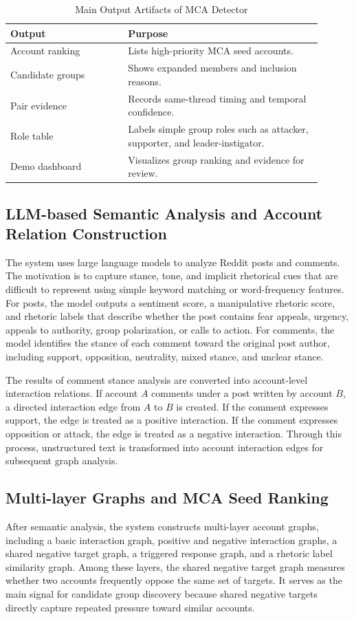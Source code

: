 \documentclass[conference]{IEEEtran}
\begin{document}
\begin{table}[htbp]
\caption{Main Output Artifacts of MCA Detector}
\label{tab:outputs}
\centering
\begin{tabular}{p{0.34\linewidth}p{0.56\linewidth}}
\toprule
\textbf{Output} & \textbf{Purpose} \\
\midrule
Account ranking & Lists high-priority MCA seed accounts. \\
Candidate groups & Shows expanded members and inclusion reasons. \\
Pair evidence & Records same-thread timing and temporal confidence. \\
Role table & Labels simple group roles such as attacker, supporter, and leader-instigator. \\
Demo dashboard & Visualizes group ranking and evidence for review. \\
\bottomrule
\end{tabular}
\end{table}

\subsection{LLM-based Semantic Analysis and Account Relation Construction}
The system uses large language models to analyze Reddit posts and comments. The motivation is to capture stance, tone, and implicit rhetorical cues that are difficult to represent using simple keyword matching or word-frequency features. For posts, the model outputs a sentiment score, a manipulative rhetoric score, and rhetoric labels that describe whether the post contains fear appeals, urgency, appeals to authority, group polarization, or calls to action. For comments, the model identifies the stance of each comment toward the original post author, including support, opposition, neutrality, mixed stance, and unclear stance.

The results of comment stance analysis are converted into account-level interaction relations. If account $A$ comments under a post written by account $B$, a directed interaction edge from $A$ to $B$ is created. If the comment expresses support, the edge is treated as a positive interaction. If the comment expresses opposition or attack, the edge is treated as a negative interaction. Through this process, unstructured text is transformed into account interaction edges for subsequent graph analysis.

\subsection{Multi-layer Graphs and MCA Seed Ranking}
After semantic analysis, the system constructs multi-layer account graphs, including a basic interaction graph, positive and negative interaction graphs, a shared negative target graph, a triggered response graph, and a rhetoric label similarity graph. Among these layers, the shared negative target graph measures whether two accounts frequently oppose the same set of targets. It serves as the main signal for candidate group discovery because shared negative targets directly capture repeated pressure toward similar accounts.
\end{document}
